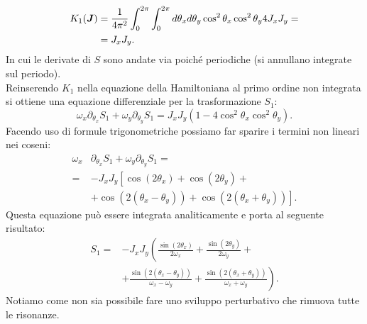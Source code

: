 \begin{exmp}
    \[\begin{aligned}
	K_1(\boldsymbol{J}) &= \frac{1}{4\pi^2}\int_{0}^{2\pi} \int_{0}^{2\pi} d\theta_xd\theta_y \cos^2\theta_x\cos^2\theta_y 4J_xJ_y =\\
		      &=J_xJ_y
    .\end{aligned}\]
    In cui le derivate di $S$ sono andate via poiché periodiche (si annullano integrate sul periodo).\\
    Reinserendo $K_1$ nella equazione della Hamiltoniana al primo ordine non integrata si ottiene una equazione differenziale per la trasformazione $S_1$:
    \[
        \omega_x \partial_{\theta_x}S_1 + \omega_y \partial_{\theta_y}S_1 = J_xJ_y\left(1-4\cos^2\theta_x\cos^2\theta_y\right)
    .\] 
    Facendo uso di formule trigonometriche possiamo far sparire i termini non lineari nei coseni:
    \[\begin{aligned}
	\omega_x& \partial_{\theta_x}S_1 + \omega_y \partial_{\theta_y}S_1 =\\
	=&  -J_xJ_y\left[\cos (2\theta_x)+\cos(2\theta_y) + \right.\\
	 &+ \left.  \cos (2(\theta_x-\theta_y)) + \cos (2(\theta_x+\theta_y))\right]
    .\end{aligned}\]
    Questa equazione può essere integrata analiticamente e porta al seguente risultato:
    \[\begin{aligned}
	S_1 =& -J_xJ_y \left(\frac{\sin (2\theta_x)}{2\omega_x} + \frac{\sin(2\theta_y)}{2\omega_y} + \right.\\
	     & + \left. \frac{\sin (2(\theta_x-\theta_y))}{\omega_x-\omega_y} + \frac{\sin (2(\theta_x+\theta_y))}{\omega_x+\omega_y}\right)
    .\end{aligned}\]
    Notiamo come non sia possibile fare uno sviluppo perturbativo che rimuova tutte le risonanze.
\end{exmp}
\noindent
